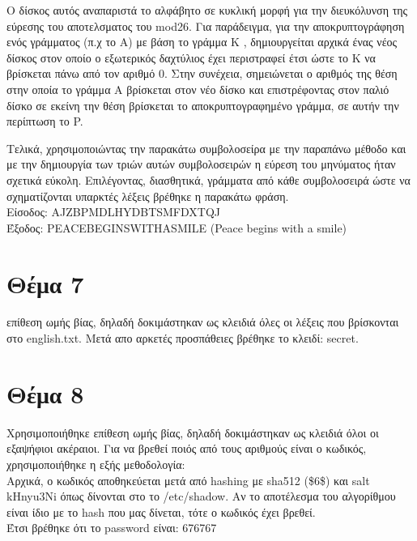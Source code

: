\documentclass[a4paper, 11pt]{article}
\newcommand{\lt}{\latintext}
\newcommand\tab[1][1cm]{\hspace*{#1}}
\begin{document}
Ο δίσκος αυτός αναπαριστά το αλφάβητο σε κυκλική μορφή για την διευκόλυνση της εύρεσης του αποτελσματος του {\lt mod26}. 
Για παράδειγμα, για την αποκρυπτογράφηση ενός γράμματος (π.χ το Α) με βάση το γράμμα Κ , δημιουργείται αρχικά ένας νέος δίσκος στον οποίο ο εξωτερικός δαχτύλιος έχει περιστραφεί έτσι ώστε το Κ να βρίσκεται πάνω από τον αριθμό 0. Στην συνέχεια, σημειώνεται ο αριθμός της θέση στην οποία το γράμμα Α βρίσκεται στον νέο δίσκο και επιστρέφοντας στον παλιό δίσκο σε εκείνη την θέση βρίσκεται το αποκρυπτογραφημένο γράμμα, σε αυτήν την περίπτωση το {\lt P}.

Τελικά, χρησιμοποιώντας την παρακάτω συμβολοσείρα με την παραπάνω μέθοδο και με την δημιουργία των τριών αυτών συμβολοσειρών η εύρεση του μηνύματος ήταν σχετικά εύκολη. Επιλέγοντας, διασθητικά, γράμματα από κάθε συμβολοσειρά ώστε να σχηματίζονται υπαρκτές λέξεις βρέθηκε η παρακάτω φράση. \\
Είσοδος: {\lt AJZBPMDLHYDBTSMFDXTQJ} \\
Έξοδος:  {\lt PEACEBEGINSWITHASMILE (Peace begins with a smile)}



\newpage


\section*{Θέμα 7}
 επίθεση ωμής βίας, δηλαδή δοκιμάστηκαν ως κλειδιά όλες οι λέξεις που βρίσκονται στο {\lt english.txt}. Μετά απο αρκετές προσπάθειες
βρέθηκε το κλειδί: {\lt secret}.



\section*{Θέμα 8}
Χρησιμοποιήθηκε επίθεση ωμής βίας, δηλαδή δοκιμάστηκαν ως κλειδιά όλοι οι εξαψήφιοι ακέραιοι. Για να βρεθεί ποιός από τους αριθμούς είναι ο κωδικός, χρησιμοποιήθηκε η εξής μεθοδολογία:\\

Αρχικά, ο κωδικός αποθηκεύεται μετά από {\lt hashing} με {\lt sha512} (\$6\$) και {\lt salt} {\lt kHnyu3Ni} όπως δίνονται στο το {\lt /etc/shadow}. Αν το αποτέλεσμα του αλγορίθμου είναι ίδιο με το {\lt hash} που μας δίνεται, τότε ο κωδικός έχει βρεθεί.\\

Έτσι βρέθηκε ότι το {\lt password} είναι: 676767
\end{document}
